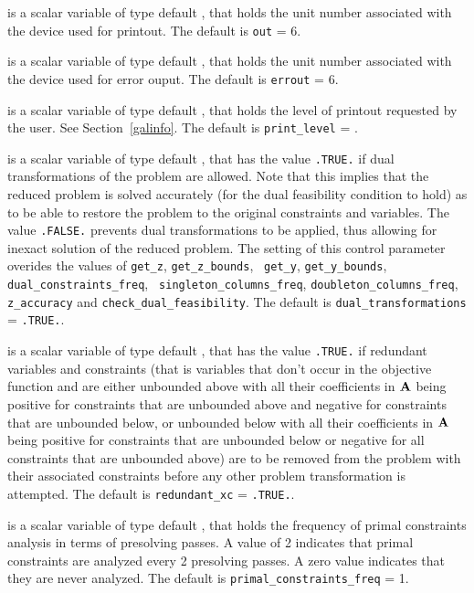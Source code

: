 \documentclass{galahad}
\newcommand{\sym}{\tt\small}
\begin{document}
\begin{description}
 is a scalar variable of type default \integer, that holds the
unit number associated with the device used for printout.
The default is {\tt out} = 6.

 is a scalar variable of type default \integer, that holds the
unit number associated with the device used for error ouput.
The default is {\tt errout} = 6.

 is a scalar variable of type default \integer, that holds the
level of printout requested by the user. See Section~\ref{galinfo}.
The default is {\tt print\_level} = {\sym \galsymsilent}.

 is a scalar variable of type default \logical, 
that has the value {\tt .TRUE.} if dual transformations of the problem are
allowed. Note that this implies that the reduced problem is solved
accurately (for the dual feasibility condition to hold) 
as to be able to restore the problem to the original
constraints and variables. The value {\tt .FALSE.} prevents dual
transformations to be applied, thus allowing for inexact
solution of the reduced problem. The setting of this control
parameter overides the values of {\tt get\_z}, {\tt get\_z\_bounds}, {\tt
get\_y}, {\tt get\_y\_bounds}, {\tt dual\_constraints\_freq}, {\tt
singleton\_columns\_freq}, {\tt doubleton\_columns\_freq}, {\tt z\_accuracy}
and {\tt  check\_dual\_feasibility}. 
The default is {\tt dual\_transformations} = {\tt .TRUE.}.

 is a scalar variable of type default \logical, 
that has the value {\tt .TRUE.} if redundant variables and constraints
(that is variables that don't occur in the objective function and are
either unbounded above with all their coefficients in ${\mathbf{A}}$ 
being positive for constraints that are unbounded above and negative for
constraints that are unbounded below, or unbounded below
with all their coefficients in ${\mathbf{A}}$ being positive for constraints that are
unbounded below or negative for all constraints that are unbounded above)
are to be removed from the problem with their associated constraints before
any other problem transformation is attempted.
The default is {\tt redundant\_xc} = {\tt .TRUE.}.

 is a scalar variable of type default \integer,
that holds the  frequency of primal constraints analysis in terms of
presolving passes.  A value of 2 indicates that primal
constraints are analyzed every 2 presolving passes. A zero
value indicates that they are never analyzed.
The default is {\tt primal\_constraints\_freq} = 1.


\end{description}
\end{document}
